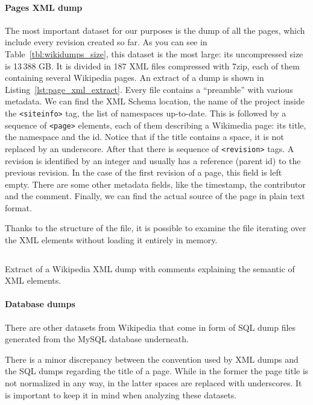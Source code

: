 \paragraph{Pages XML dump}
The most important dataset for our purposes is the dump of all the pages, which include every revision created so far.
As you can see in Table~\ref{tbl:wikidumps_size}, this dataset is the most large: its uncompressed size is 13\,388 GB\@.
It is divided in 187 XML files compressed with 7zip, each of them containing several Wikipedia pages.
An extract of a dump is shown in Listing~\ref{lst:page_xml_extract}.
Every file contains a ``preamble'' with various metadata.
We can find the XML Schema location, the name of the project inside the \texttt{<siteinfo>} tag, the list of namespaces up-to-date.
This is followed by a sequence of \texttt{<page>} elements, each of them describing a Wikimedia page: its title, the namespace and the id.
Notice that if the title contains a space, it is not replaced by an underscore.
After that there is sequence of \texttt{<revision>} tags.
A revision is identified by an integer and usually has a reference (parent id) to the previous revision.
In the case of the first revision of a page, this field is left empty.
There are some other metadata fields, like the timestamp, the contributor and the comment.
Finally, we can find the actual source of the page in plain text format.

Thanks to the structure of the file, it is possible to examine the file iterating over the XML elements without loading it entirely in memory.

\begin{listing}[t]
    \inputminted[breaklines=true]{xml}{assets/page_xml_extract.xml}
    \caption{Extract of a Wikipedia XML dump with comments explaining the semantic of XML elements.}
    \label{lst:page_xml_extract}
\end{listing}

\paragraph{Database dumps}
There are other datasets from Wikipedia that come in form of SQL dump files generated from the MySQL database underneath.

There is a minor discrepancy between the convention used by XML dumps and the SQL dumps regarding the title of a page.
While in the former the page title is not normalized in any way, in the latter spaces are replaced with underscores.
It is important to keep it in mind when analyzing these datasets.

